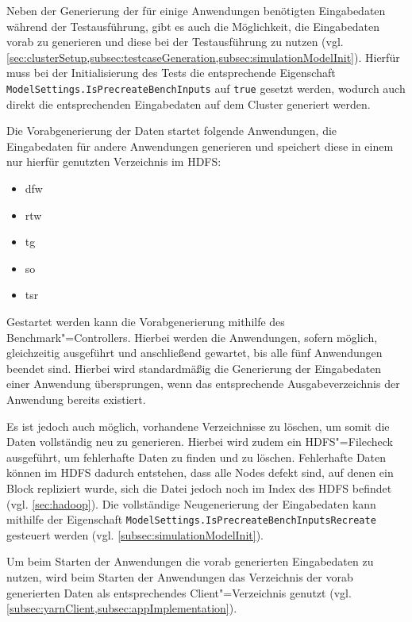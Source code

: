 Neben der Generierung der für einige Anwendungen benötigten Eingabedaten während der Testausführung, gibt es auch die Möglichkeit, die Eingabedaten vorab zu generieren und diese bei der Testausführung zu nutzen (vgl. \cref{sec:clusterSetup,subsec:testcaseGeneration,subsec:simulationModelInit}).
Hierfür muss bei der Initialisierung des Tests die entsprechende Eigenschaft \texttt{ModelSettings.IsPrecreateBenchInputs} auf \texttt{true} gesetzt werden, wodurch auch direkt die entsprechenden Eingabedaten auf dem Cluster generiert werden.

Die Vorabgenerierung der Daten startet folgende Anwendungen, die Eingabedaten für andere Anwendungen generieren und speichert diese in einem nur hierfür genutzten Verzeichnis im HDFS:

\begin{itemize}
    \item \acrlong{dfw}
    \item \acrlong{rtw}
    \item \acrlong{tg}
    \item \acrlong{so}
    \item \acrlong{tsr}
\end{itemize}

Gestartet werden kann die Vorabgenerierung mithilfe des Benchmark"=Controllers.
Hierbei werden die Anwendungen, sofern möglich, gleichzeitig ausgeführt und anschließend gewartet, bis alle fünf Anwendungen beendet sind.
Hierbei wird standardmäßig die Generierung der Eingabedaten einer Anwendung übersprungen, wenn das entsprechende Ausgabeverzeichnis der Anwendung bereits existiert.

Es ist jedoch auch möglich, vorhandene Verzeichnisse zu löschen, um somit die Daten vollständig neu zu generieren.
Hierbei wird zudem ein HDFS"=Filecheck ausgeführt, um fehlerhafte Daten zu finden und zu löschen.
Fehlerhafte Daten können im HDFS \zB dadurch entstehen, dass alle Nodes defekt sind, auf denen ein Block repliziert wurde, sich die Datei jedoch noch im Index des HDFS befindet (vgl. \cref{sec:hadoop}).
Die vollständige Neugenerierung der Eingabedaten kann mithilfe der Eigenschaft \texttt{ModelSettings.IsPrecreateBenchInputsRecreate} gesteuert werden (vgl. \cref{subsec:simulationModelInit}).

Um beim Starten der Anwendungen die vorab generierten Eingabedaten zu nutzen, wird beim Starten der Anwendungen das Verzeichnis der vorab generierten Daten als entsprechendes Client"=Verzeichnis genutzt (vgl. \cref{subsec:yarnClient,subsec:appImplementation}).
